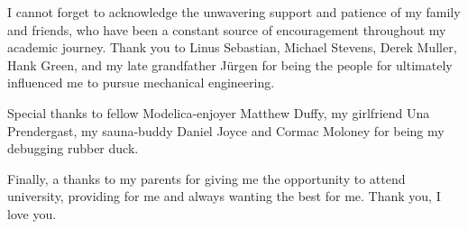 I cannot forget to acknowledge the unwavering support and patience of my family and friends, who have been a constant source of encouragement throughout my academic journey. Thank you to Linus Sebastian, Michael Stevens, Derek Muller, Hank Green, and my late grandfather J\"urgen for being the people for ultimately influenced me to pursue mechanical engineering. 


Special thanks to fellow Modelica-enjoyer Matthew Duffy, my girlfriend Una Prendergast, my sauna-buddy Daniel Joyce and Cormac Moloney for being my debugging rubber duck. 

Finally, a thanks to my parents for giving me the opportunity to attend university, providing for me and always wanting the best for me. Thank you, I love you.








\endgroup
